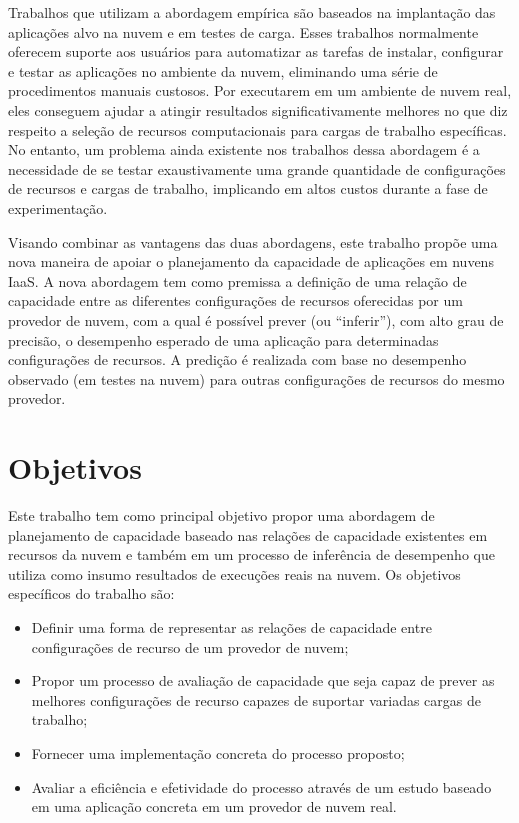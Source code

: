 Trabalhos que utilizam a abordagem empírica são baseados na implantação das aplicações alvo na nuvem 
e em testes de carga. Esses trabalhos normalmente oferecem suporte aos usuários
para automatizar as tarefas de instalar, configurar e testar as aplicações no
ambiente da nuvem, eliminando uma série de procedimentos manuais custosos. Por
executarem em um ambiente de nuvem real, eles conseguem ajudar a atingir resultados
significativamente melhores no que diz respeito a seleção de recursos
computacionais para cargas de trabalho específicas. No entanto, um problema ainda 
existente nos trabalhos dessa abordagem é a necessidade de se testar exaustivamente uma grande 
quantidade de configurações de recursos e cargas de trabalho, implicando em altos 
custos durante a fase de experimentação.

Visando combinar as vantagens das duas abordagens, este trabalho
propõe uma nova maneira de apoiar o planejamento da capacidade de aplicações
em nuvens IaaS. A nova abordagem tem como premissa a definição de uma relação 
de capacidade entre as diferentes configurações de recursos oferecidas por um 
provedor de nuvem, com a qual é possível prever (ou ``inferir''), com alto grau 
de precisão, o desempenho esperado de uma aplicação para determinadas configurações 
de recursos. A predição é realizada com base no desempenho observado (em testes 
na nuvem) para outras configurações de recursos do mesmo provedor.

\section{Objetivos}
Este trabalho tem como principal objetivo propor uma abordagem de
planejamento de capacidade baseado nas relações de capacidade existentes em
recursos da nuvem e também em um processo de inferência de desempenho 
que utiliza como insumo resultados de execuções reais na nuvem. Os objetivos
específicos do trabalho são:

\begin{itemize}
  \item Definir uma forma de representar as relações de capacidade entre
  configurações de recurso de um provedor de nuvem;
  \item Propor um processo de avaliação de capacidade que seja capaz de 
  prever as melhores configurações de recurso capazes de suportar variadas
  cargas de trabalho;
  \item Fornecer uma implementação concreta do processo proposto;
  \item Avaliar a eficiência e efetividade do processo através de um estudo
  baseado em uma aplicação concreta em um provedor de nuvem real.
\end{itemize}
 
